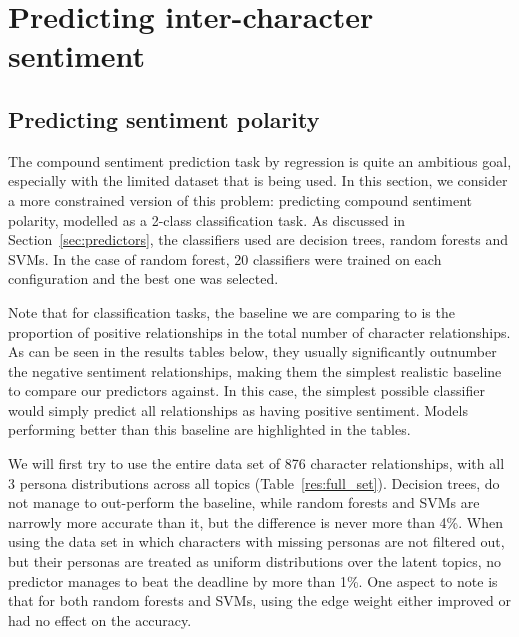 \documentclass[bsc,frontabs,singlespacing,parskip]{infthesis} %
\begin{document}
\section{Predicting inter-character sentiment}

\subsection{Predicting sentiment polarity}
The compound sentiment prediction task by regression is quite an ambitious goal, especially with the limited dataset that is being used. In this section, we consider a more constrained version of this problem: predicting compound sentiment polarity, modelled as a 2-class classification task. As discussed in Section~\ref{sec:predictors}, the classifiers used are decision trees, random forests and SVMs. In the case of random forest, 20 classifiers were trained on each configuration and the best one was selected.

Note that for classification tasks, the baseline we are comparing to is the proportion of positive relationships in the total number of character relationships. As can be seen in the results tables below, they usually significantly outnumber the negative sentiment relationships, making them the simplest realistic baseline to compare our predictors against. In this case, the simplest possible classifier would simply predict all relationships as having positive sentiment. Models performing better than this baseline are highlighted in the tables.

We will first try to use the entire data set of 876 character relationships, with all 3 persona distributions across all topics (Table~\ref{res:full_set}). Decision trees, do not manage to out-perform the baseline, while random forests and SVMs are narrowly more accurate than it, but the difference is never more than 4\%. When using the data set in which characters with missing personas are not filtered out, but their personas are treated as uniform distributions over the latent topics, no predictor manages to beat the deadline by more than 1\%. One aspect to note is that for both random forests and SVMs, using the edge weight either improved or had no effect on the accuracy.
\end{document}
